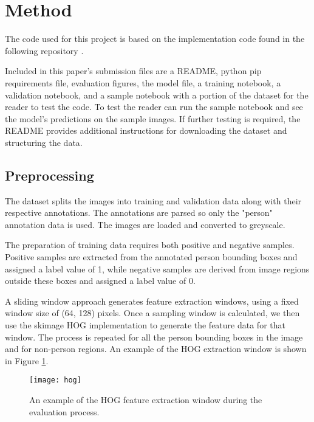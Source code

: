 \section{Method}

The code used for this project is based on the implementation code found in the following repository \cite{plvs2023hogdetection}.

Included in this paper's submission files are a README, python pip requirements file, evaluation figures, the model file, a training notebook, a validation notebook, and a sample notebook with a portion of the dataset for the reader to test the code.
To test the reader can run the sample notebook and see the model's predictions on the sample images.
If further testing is required, the README provides additional instructions for downloading the dataset and structuring the data.

\subsection{Preprocessing}

The dataset splits the images into training and validation data along with their respective annotations. 
The annotations are parsed so only the "person" annotation data is used.
The images are loaded and converted to greyscale.

The preparation of training data requires both positive and negative samples. 
Positive samples are extracted from the annotated person bounding boxes and assigned a label value of 1, while negative samples are derived from image regions outside these boxes and assigned a label value of 0. 

A sliding window approach generates feature extraction windows, using a fixed window size of (64, 128) pixels.
Once a sampling window is calculated, we then use the skimage \cite{vanderwalt2014scikit} HOG implementation to generate the feature data for that window.
The process is repeated for all the person bounding boxes in the image and for non-person regions. 
An example of the HOG extraction window is shown in Figure \ref{fig:hog_example}.

\begin{figure}[htbp]
  \centering
  \texttt{[image: hog]}
  \caption{An example of the HOG feature extraction window during the evaluation process.}
  \label{fig:hog_example}
\end{figure}

